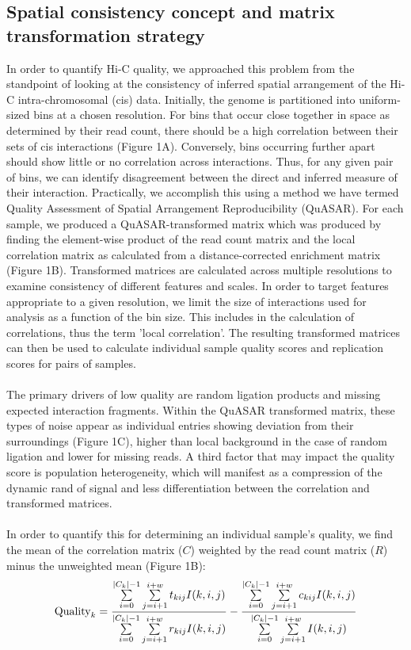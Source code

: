 \subsection{Spatial consistency concept and matrix transformation strategy}

In order to quantify Hi-C quality, we approached this problem from the standpoint of looking at the consistency of inferred spatial arrangement of the Hi-C intra-chromosomal (cis) data. Initially, the genome is partitioned into uniform-sized bins at a chosen resolution. For bins that occur close together in space as determined by their read count, there should be a high correlation between their sets of cis interactions (Figure 1A). Conversely, bins occurring further apart should show little or no correlation across interactions. Thus, for any given pair of bins, we can identify disagreement between the direct and inferred measure of their interaction. Practically, we accomplish this using a method we have termed Quality Assessment of Spatial Arrangement Reproducibility (QuASAR). For each sample, we produced a QuASAR-transformed matrix which was produced by finding the element-wise product of the read count matrix and the local correlation matrix as calculated from a distance-corrected enrichment matrix (Figure 1B). Transformed matrices are calculated across multiple resolutions to examine consistency of different features and scales. In order to target features appropriate to a given resolution, we limit the size of interactions used for analysis as a function of the bin size. This includes in the calculation of correlations, thus the term 'local correlation'. The resulting transformed matrices can then be used to calculate individual sample quality scores and replication scores for pairs of samples.
\\\\
The primary drivers of low quality are random ligation products and missing expected interaction fragments. Within the QuASAR transformed matrix, these types of noise appear as individual entries showing deviation from their surroundings (Figure 1C), higher than local background in the case of random ligation and lower for missing reads. A third factor that may impact the quality score is population heterogeneity, which will manifest as a compression of the dynamic rand of signal and less differentiation between the correlation and transformed matrices.
\\\\
In order to quantify this for determining an individual sample's quality, we find the mean of the correlation matrix ($C$) weighted by the read count matrix ($R$) minus the unweighted mean (Figure 1B):
\[\textnormal{Quality}_{k}=\frac{\sum\limits_{i=0}^{|C_k|-1}\sum\limits_{j=i+1}^{i+w}t_{kij}I(k,i,j)}{\sum\limits_{i=0}^{|C_k|-1}\sum\limits_{j=i+1}^{i+w}r_{kij}I(k,i,j)}-\frac{\sum\limits_{i=0}^{|C_k|-1}\sum\limits_{j=i+1}^{i+w}c_{kij}I(k,i,j)}{\sum\limits_{i=0}^{|C_k|-1}\sum\limits_{j=i+1}^{i+w}I(k,i,j)}\]

